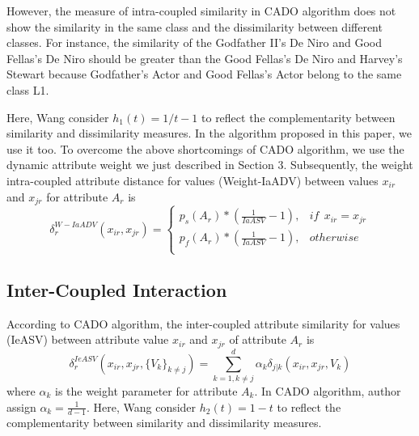 \documentclass[review]{elsarticle}
\begin{document}
However, the measure of intra-coupled similarity in CADO algorithm does not show the similarity in the same class and the dissimilarity between different classes. For instance, the similarity of the Godfather II's De Niro and Good Fellas's De Niro should be greater than the Good Fellas's De Niro and Harvey's Stewart because Godfather's Actor and Good Fellas's Actor belong to the same class L1.

Here, Wang consider $h_1(t) = 1/t - 1$ to reflect the complementarity between similarity and dissimilarity measures. In the algorithm proposed in this paper, we use it too. To overcome the above shortcomings of CADO algorithm, we use the dynamic attribute weight we just described in Section 3. Subsequently, the weight intra-coupled attribute distance for values (Weight-IaADV) between values $x_{ir}$ and $x_{jr}$ for attribute $A_r$ is
\begin{equation}
\label{equ15}
\delta_{r}^{W-IaADV}(x_{ir},x_{jr}) =
\left\{\begin{array}{cc}
  p_s(A_r) * (\frac{1}{IaASV} - 1), & if\ \ x_{ir} = x_{jr} \\
  p_f(A_r) * (\frac{1}{IaASV} - 1), & otherwise \\
  \end{array} \right.
\end{equation}

\subsection{Inter-Coupled Interaction}
According to CADO algorithm, the inter-coupled attribute similarity for values (IeASV) between attribute value $x_{ir}$ and $x_{jr}$ of attribute $A_r$ is
\begin{equation}
\delta_{r}^{IeASV}(x_{ir},x_{jr},\{V_k\}_{k \neq j}) = \sum_{k=1,k \neq j}^{d} \alpha_k \delta_{j|k}(x_{ir},x_{jr},V_k)
\label{equ16}
\end{equation}
where $\alpha_k$ is the weight parameter for attribute $A_k$. In CADO algorithm, author assign $\alpha_k = \frac{1}{d-1}$. Here, Wang consider $h_2(t) = 1 - t$ to reflect the complementarity between similarity and dissimilarity measures.
\end{document}
